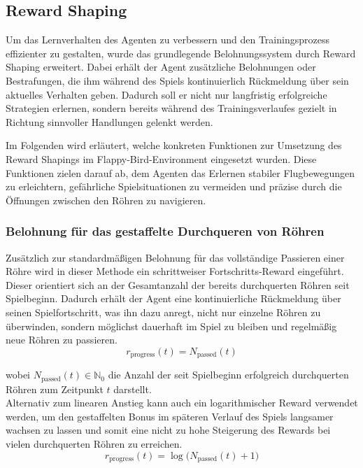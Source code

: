 \documentclass[conference]{IEEEtran}
\begin{document}
\subsection{Reward Shaping}\label{reward_shaping}
Um das Lernverhalten des Agenten zu verbessern und den Trainingsprozess effizienter zu gestalten, wurde das grundlegende Belohnungssystem durch Reward Shaping erweitert. Dabei erhält der Agent zusätzliche Belohnungen oder Bestrafungen, die ihm während des Spiels kontinuierlich Rückmeldung über sein aktuelles Verhalten geben. Dadurch soll er nicht nur langfristig erfolgreiche Strategien erlernen, sondern bereits während des Trainingsverlaufes gezielt in Richtung sinnvoller Handlungen gelenkt werden.

Im Folgenden wird erläutert, welche konkreten Funktionen zur Umsetzung des Reward Shapings im Flappy-Bird-Environment eingesetzt wurden. Diese Funktionen zielen darauf ab, dem Agenten das Erlernen stabiler Flugbewegungen zu erleichtern, gefährliche Spielsituationen zu vermeiden und präzise durch die Öffnungen zwischen den Röhren zu navigieren.\\

\subsubsection{Belohnung für das gestaffelte Durchqueren von Röhren}\label{reward_shaping_first}
Zusätzlich zur standardmäßigen Belohnung für das vollständige Passieren einer Röhre wird in dieser Methode ein schrittweiser Fortschritts-Reward eingeführt. Dieser orientiert sich an der Gesamtanzahl der bereits durchquerten Röhren seit Spielbeginn. Dadurch erhält der Agent eine kontinuierliche Rückmeldung über seinen Spielfortschritt, was ihn dazu anregt, nicht nur einzelne Röhren zu überwinden, sondern möglichst dauerhaft im Spiel zu bleiben und regelmäßig neue Röhren zu passieren.
\begin{equation}
	r_{\text{progress}}(t) = N_{\text{passed}}(t)
\end{equation}

wobei \( N_{\text{passed}}(t) \in \mathbb{N}_0 \) die Anzahl der seit Spielbeginn erfolgreich durchquerten Röhren zum Zeitpunkt \( t \) darstellt.\\

Alternativ zum linearen Anstieg kann auch ein logarithmischer Reward verwendet werden, um den gestaffelten Bonus im späteren Verlauf des Spiels langsamer wachsen zu lassen und somit eine nicht zu hohe Steigerung des Rewards bei vielen durchquerten Röhren zu erreichen.
\begin{equation}
	r_{\text{progress}}(t) = \log\big(N_{\text{passed}}(t) + 1\big)
\end{equation}
\end{document}
